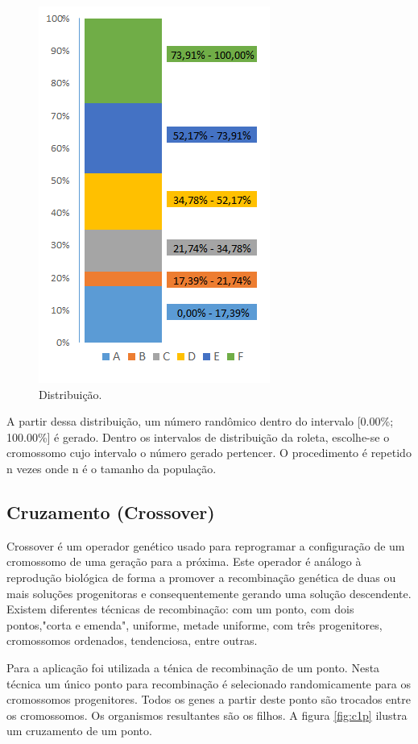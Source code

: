 \documentclass[twoside]{article}
\begin{document}
\begin{multicols}{2}
\begin{figure}[H]
\label{fig:ditrib}
  \caption{Distribuição.}
  \centering
    \includegraphics[scale = 1]{roleta_dist2.png}
\end{figure}

A partir dessa distribuição, um número randômico dentro do intervalo [0.00\%; 100.00\%] é gerado. Dentro os intervalos de distribuição da roleta, escolhe-se o cromossomo cujo intervalo o número gerado pertencer. O procedimento é repetido n vezes onde n é o tamanho da população.

\subsection{Cruzamento (Crossover)}
Crossover é um operador genético usado para reprogramar a configuração de um cromossomo de uma geração para a próxima. Este operador é análogo à reprodução biológica de forma a promover a recombinação genética de duas ou mais soluções progenitoras e consequentemente gerando uma solução descendente. Existem diferentes técnicas de recombinação: com um ponto, com dois pontos,"corta e emenda", uniforme, metade uniforme, com três progenitores, cromossomos ordenados, tendenciosa, entre outras.

Para a aplicação foi utilizada a ténica de recombinação de um ponto. Nesta técnica um único ponto para recombinação é selecionado randomicamente para os cromossomos progenitores. Todos os genes a partir deste ponto são trocados entre os cromossomos. Os organismos resultantes são os filhos. A figura \ref{fig:c1p} ilustra um cruzamento de um ponto.


\end{multicols}
\end{document}
